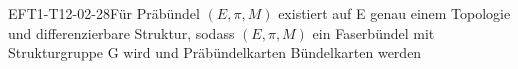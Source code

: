 
\begin{PROP}{EFT1-T12-02-28}{Für Präbündel $(E,\pi,M)$ existiert auf E genau einem Topologie und differenzierbare Struktur, sodass $(E,\pi,M)$ ein Faserbündel mit Strukturgruppe G wird und Präbündelkarten Bündelkarten werden}
\end{PROP}
